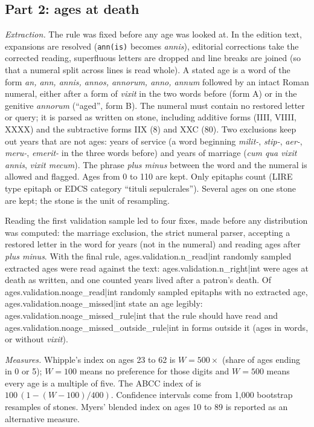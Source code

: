 \subsection{Part 2: ages at death}
\textit{Extraction.} The rule was fixed before any age was looked at. In the edition text, expansions are resolved (\texttt{ann(is)} becomes \textit{annis}), editorial corrections take the corrected reading, superfluous letters are dropped and line breaks are joined (so that a numeral split across lines is read whole). A stated age is a word of the form \textit{an, ann, annis, annos, annorum, anno, annum} followed by an intact Roman numeral, either after a form of \textit{vixit} in the two words before (form A) or in the genitive \textit{annorum} (``aged'', form B). The numeral must contain no restored letter or query; it is parsed as written on stone, including additive forms (IIII, VIIII, XXXX) and the subtractive forms IIX (8) and XXC (80). Two exclusions keep out years that are not ages: years of service (a word beginning \textit{milit-}, \textit{stip-}, \textit{aer-}, \textit{meru-}, \textit{emerit-} in the three words before) and years of marriage (\textit{cum qua vixit annis}, \textit{vixit mecum}). The phrase \textit{plus minus} between the word and the numeral is allowed and flagged. Ages from 0 to 110 are kept. Only epitaphs count (LIRE type epitaph or EDCS category ``tituli sepulcrales''). Several ages on one stone are kept; the stone is the unit of resampling.

Reading the first validation sample led to four fixes, made before any distribution was computed: the marriage exclusion, the strict numeral parser, accepting a restored letter in the word for years (not in the numeral) and reading ages after \textit{plus minus}. With the final rule, {{ages.validation.n_read|int}} randomly sampled extracted ages were read against the text: {{ages.validation.n_right|int}} were ages at death as written, and one counted years lived after a patron's death. Of {{ages.validation.noage_read|int}} randomly sampled epitaphs with no extracted age, {{ages.validation.noage_missed|int}} state an age legibly: {{ages.validation.noage_missed_rule|int}} that the rule should have read and {{ages.validation.noage_missed_outside_rule|int}} in forms outside it (ages in words, or without \textit{vixit}).

\textit{Measures.} Whipple's index on ages 23 to 62 is $W = 500 \times$ (share of ages ending in 0 or 5); $W = 100$ means no preference for those digits and $W = 500$ means every age is a multiple of five. The ABCC index of \citet{ahearn2009} is $100\,(1 - (W-100)/400)$. Confidence intervals come from 1,000 bootstrap resamples of stones. Myers' blended index \citep{myers1940} on ages 10 to 89 is reported as an alternative measure.

